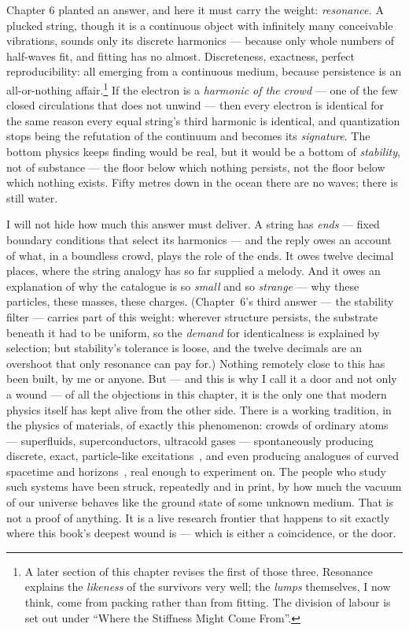 \documentclass[fontsize=11pt,paper=a4,pagesize=auto,parskip=half-]{scrbook}
\begin{document}
Chapter 6 planted an answer, and here it must carry the weight: \emph{resonance.} A plucked string, though it is a continuous object with infinitely many conceivable vibrations, sounds only its discrete harmonics --- because only whole numbers of half-waves fit, and fitting has no almost. Discreteness, exactness, perfect reproducibility: all emerging from a continuous medium, because persistence is an all-or-nothing affair.\footnote{A later section of this chapter revises the first of those three. Resonance explains the \emph{likeness} of the survivors very well; the \emph{lumps} themselves, I now think, come from packing rather than from fitting. The division of labour is set out under ``Where the Stiffness Might Come From''.} If the electron is a \emph{harmonic of the crowd} --- one of the few closed circulations that does not unwind --- then every electron is identical for the same reason every equal string's third harmonic is identical, and quantization stops being the refutation of the continuum and becomes its \emph{signature}. The bottom physics keeps finding would be real, but it would be a bottom of \emph{stability}, not of substance --- the floor below which nothing persists, not the floor below which nothing exists. Fifty metres down in the ocean there are no waves; there is still water.

I will not hide how much this answer must deliver. A string has \emph{ends} --- fixed boundary conditions that select its harmonics --- and the reply owes an account of what, in a boundless crowd, plays the role of the ends. It owes twelve decimal places, where the string analogy has so far supplied a melody. And it owes an explanation of why the catalogue is so \emph{small} and so \emph{strange} --- why these particles, these masses, these charges. (Chapter~6's third answer --- the stability filter --- carries part of this weight: wherever structure persists, the substrate beneath it had to be uniform, so the \emph{demand} for identicalness is explained by selection; but stability's tolerance is loose, and the twelve decimals are an overshoot that only resonance can pay for.) Nothing remotely close to this has been built, by me or anyone. But --- and this is why I call it a door and not only a wound --- of all the objections in this chapter, it is the only one that modern physics itself has kept alive from the other side. There is a working tradition, in the physics of materials, of exactly this phenomenon: crowds of ordinary atoms --- superfluids, superconductors, ultracold gases --- spontaneously producing discrete, exact, particle-like excitations~\cite{volovik2003}, and even producing analogues of curved spacetime and horizons~\cite{barcelo2011}, real enough to experiment on. The people who study such systems have been struck, repeatedly and in print, by how much the vacuum of our universe behaves like the ground state of some unknown medium. That is not a proof of anything. It is a live research frontier that happens to sit exactly where this book's deepest wound is --- which is either a coincidence, or the door.
\end{document}
